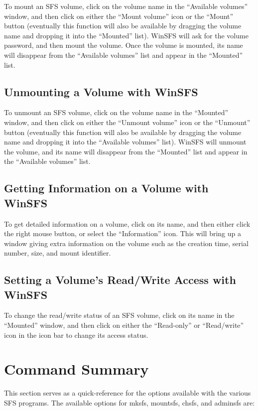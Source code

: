 To mount an SFS volume, click on the volume name in the ``Available volumes''
window, and then click on either the ``Mount volume'' icon or the ``Mount'' button
(eventually this function will also be available by dragging the volume name
and dropping it into the ``Mounted'' list).  WinSFS will ask for the volume
password, and then mount the volume.  Once the volume is mounted, its name will
disappear from the ``Available volumes'' list and appear in the ``Mounted'' list.


\subsection{Unmounting a Volume with WinSFS}

To unmount an SFS volume, click on the volume name in the ``Mounted'' window, and
then click on either the ``Unmount volume'' icon or the ``Unmount'' button
(eventually this function will also be available by dragging the volume name
and dropping it into the ``Available volumes'' list).  WinSFS will unmount the
volume, and its name will disappear from the ``Mounted'' list and appear in the
``Available volumes'' list.


\subsection{Getting Information on a Volume with WinSFS}

To get detailed information on a volume, click on its name, and then either
click the right mouse button, or select the ``Information'' icon.  This will
bring up a window giving extra information on the volume such as the creation
time, serial number, size, and mount identifier.


\subsection{Setting a Volume's Read/Write Access with WinSFS}

To change the read/write status of an SFS volume, click on its name in the
``Moun\-ted'' window, and then click on either the ``Read-only'' or ``Read/write'' icon
in the icon bar to change its access status.


\section{Command Summary}

This section serves as a quick-reference for the options available with the
various SFS programs.  The available options for mksfs, mountsfs, chsfs, and
adminsfs are:

